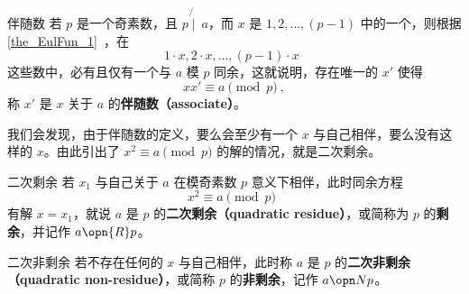 
\begin{definition}{伴随数}
若 $p$ 是一个奇素数，且 $p \not{\mid}~ a$，而 $x$ 是 $1, 2, \dots, (p-1)$ 中的一个，则根据\autoref{the_EulFun_1}~，在
\begin{equation}
1 \cdot x, 2 \cdot x, \dots, (p-1)\cdot x ~~
\end{equation}
这些数中，必有且仅有一个与 $a$ 模 $p$ 同余，这就说明，存在唯一的 $x'$ 使得
\begin{equation}
x x' \equiv a \pmod p ~,
\end{equation}
称 $x'$ 是 $x$ 关于 $a$ 的\textbf{伴随数（associate）}。
\end{definition}
我们会发现，由于伴随数的定义，要么会至少有一个 $x$ 与自己相伴，要么没有这样的 $x$。由此引出了 $x^2 \equiv a \pmod p$ 的解的情况，就是二次剩余。
\begin{definition}{二次剩余}
若 $x_1$ 与自己关于 $a$ 在模奇素数 $p$ 意义下相伴，此时同余方程
\begin{equation}
x^2 \equiv a \pmod p ~~
\end{equation}
有解 $x = x_1$，就说 $a$ 是 $p$ 的\textbf{二次剩余（quadratic residue）}，或简称为 $p$ 的\textbf{剩余}，并记作 $a \opn{R} p$。
\end{definition}

\begin{definition}{二次非剩余}
若不存在任何的 $x$ 与自己相伴，此时称 $a$ 是 $p$ 的\textbf{二次非剩余（quadratic non-residue）}，或简称 $p$ 的\textbf{非剩余}，记作 $a \opn N p$。
\end{definition}
